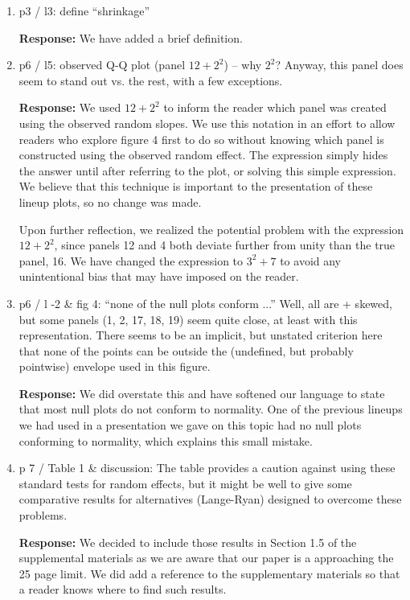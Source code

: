 \documentclass[11pt]{article}
\begin{document}
\begin{enumerate}
\item p3 / l3: define ``shrinkage''

\textbf{Response:} We have added a brief definition.

\item p6 / l5: observed Q-Q plot (panel $12 + 2^2$) -- why $2^2$? Anyway, this panel does seem to stand out vs. the rest, with a few exceptions.

\textbf{Response:} We used $12 + 2^2$ to inform the reader which panel was created using the observed random slopes. We use this notation in an effort to allow readers who explore figure 4 first to do so without knowing which panel is constructed using the observed random effect. The expression simply hides the answer until after referring to the plot, or solving this simple expression. We believe that this technique is important to the presentation of these lineup plots, so no change was made.

Upon further reflection, we realized the potential problem with the expression $12+2^2$, since panels 12 and 4 both deviate further from unity than the true panel, 16. We have changed the expression to $3^2+7$ to avoid any unintentional bias that may have imposed on the reader.

\item p6 / l -2 \& fig 4: ``none of the null plots conform ...'' Well, all are + skewed, but some panels (1, 2, 17, 18, 19) seem quite close, at least with this representation. There seems to be an implicit, but unstated criterion here that none of the points can be outside the (undefined, but probably pointwise) envelope used in this figure.

\textbf{Response:} We did overstate this and have softened our language to state that most null plots do not conform to normality. One of the previous lineups we had used in a presentation we gave on this topic had no null plots conforming to normality, which explains this small mistake.

\item p 7 / Table 1 \& discussion: The table provides a caution against using these standard tests for random effects, but it might be well to give some comparative results for alternatives (Lange-Ryan) designed to overcome these problems.

\textbf{Response:} We decided to include those results in Section 1.5 of the supplemental materials as we are aware that our paper is a approaching the 25 page limit. We did add a reference to the supplementary materials so that a reader knows where to find such results.


\end{enumerate}
\end{document}
